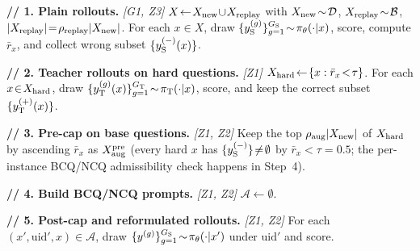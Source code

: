 \documentclass{llmxive}
\begin{document}
\begin{algorithm*}[!htbp]
\SetAlgoLined
\DontPrintSemicolon
{}

\textbf{// 1. Plain rollouts.} \textit{[G1, Z3]}\;
$X\!\leftarrow\!X_{\rm new}\!\cup\!X_{\rm replay}$ with $X_{\rm new}\!\sim\!\mathcal{D}$, $X_{\rm replay}\!\sim\!\mathcal{B}$, $|X_{\rm replay}|\!=\!\rho_{\rm replay}|X_{\rm new}|$. For each $x\!\in\!X$, draw $\{y_{\rm S}^{(g)}\}_{g=1}^{G_{\rm S}}\!\sim\!\pi_\theta(\cdot|x)$, score, compute $\bar{r}_x$, and collect wrong subset $\{y_{\rm S}^{(-)}(x)\}$.\;

\textbf{// 2. Teacher rollouts on hard questions.} \textit{[Z1]}\;
$X_{\rm hard}\!\leftarrow\!\{x:\bar{r}_x\!<\!\tau\}$. For each $x\!\in\!X_{\rm hard}$, draw $\{y_{\rm T}^{(g)}(x)\}_{g=1}^{G_{\rm T}}\!\sim\!\pi_{\rm T}(\cdot|x)$, score, and keep the correct subset $\{y_{\rm T}^{(+)}(x)\}$.\;

\textbf{// 3. Pre-cap on base questions.} \textit{[Z1, Z2]}\;
Keep the top $\rho_{\rm aug}|X_{\rm new}|$ of $X_{\rm hard}$ by ascending $\bar{r}_x$ as $X_{\rm aug}^{\rm pre}$ (every hard $x$ has $\{y_{\rm S}^{(-)}\}\!\neq\!\emptyset$ by $\bar{r}_x\!<\!\tau\!=\!0.5$; the per-instance BCQ/NCQ admissibility check happens in Step~4).\;

\textbf{// 4. Build BCQ/NCQ prompts.} \textit{[Z1, Z2]}\;
$\mathcal{A}\!\leftarrow\!\emptyset$. 

\textbf{// 5. Post-cap and reformulated rollouts.} \textit{[Z1, Z2]}\;
For each $(x',\mathrm{uid}',x)\!\in\!\mathcal{A}$, draw $\{y^{(g)}\}_{g=1}^{G_{\rm S}}\!\sim\!\pi_\theta(\cdot|x')$ under $\mathrm{uid}'$ and score.\;


\end{algorithm*}
\end{document}
